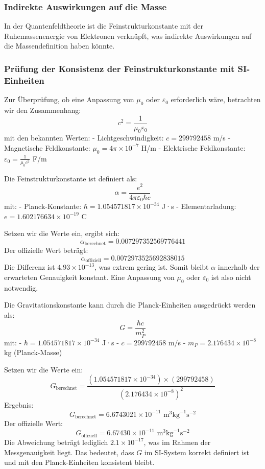 \documentclass{article}
\begin{document}
	\subsubsection{Indirekte Auswirkungen auf die Masse}
	In der Quantenfeldtheorie ist die Feinstrukturkonstante mit der Ruhemassenenergie von Elektronen verknüpft, was indirekte Auswirkungen auf die Massendefinition haben könnte.
	\subsubsection{Prüfung der Konsistenz der Feinstrukturkonstante mit SI-Einheiten}
	
	
	Zur Überprüfung, ob eine Anpassung von \( \mu_0 \) oder \( \varepsilon_0 \) erforderlich wäre, betrachten wir den Zusammenhang:
	\[
	c^2 = \frac{1}{\mu_0 \varepsilon_0}
	\]
	mit den bekannten Werten:
	- Lichtgeschwindigkeit: \( c = 299792458 \) m/s
	- Magnetische Feldkonstante: \( \mu_0 = 4\pi \times 10^{-7} \) H/m
	- Elektrische Feldkonstante: \( \varepsilon_0 = \frac{1}{\mu_0 c^2} \) F/m
	
	Die Feinstrukturkonstante ist definiert als:
	\[
	\alpha = \frac{e^2}{4\pi \varepsilon_0 \hbar c}
	\]
	mit:
	- Planck-Konstante: \( \hbar = 1.054571817 \times 10^{-34} \) J·s
	- Elementarladung: \( e = 1.602176634 \times 10^{-19} \) C
	
	Setzen wir die Werte ein, ergibt sich:
	\[
	\alpha_{\text{berechnet}} = 0.007297352569776441
	\]
	Der offizielle Wert beträgt:
	\[
	\alpha_{\text{offiziell}} = 0.0072973525692838015
	\]
	Die Differenz ist \( 4.93 \times 10^{-13} \), was extrem gering ist. Somit bleibt \( \alpha \) innerhalb der erwarteten Genauigkeit konstant. Eine Anpassung von \( \mu_0 \) oder \( \varepsilon_0 \) ist also nicht notwendig.
	
	Die Gravitationskonstante kann durch die Planck-Einheiten ausgedrückt werden als:
	\[
	G = \frac{\hbar c}{m_P^2}
	\]
	mit:
	- \( \hbar = 1.054571817 \times 10^{-34} \) J·s
	- \( c = 299792458 \) m/s
	- \( m_P = 2.176434 \times 10^{-8} \) kg (Planck-Masse)
	
	Setzen wir die Werte ein:
	\[
	G_{\text{berechnet}} = \frac{(1.054571817 \times 10^{-34}) \times (299792458)}{(2.176434 \times 10^{-8})^2}
	\]
	Ergebnis:
	\[
	G_{\text{berechnet}} = 6.6743021 \times 10^{-11} \text{ m}^3\text{kg}^{-1}\text{s}^{-2}
	\]
	Der offizielle Wert:
	\[
	G_{\text{offiziell}} = 6.67430 \times 10^{-11} \text{ m}^3\text{kg}^{-1}\text{s}^{-2}
	\]
	Die Abweichung beträgt lediglich \( 2.1 \times 10^{-17} \), was im Rahmen der Messgenauigkeit liegt. Das bedeutet, dass \( G \) im SI-System korrekt definiert ist und mit den Planck-Einheiten konsistent bleibt.
	
\end{document}
